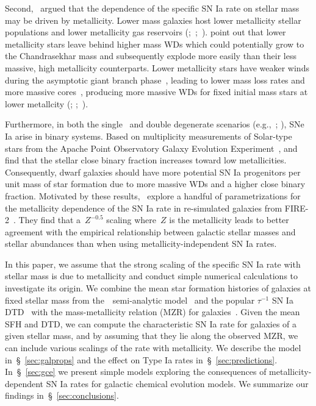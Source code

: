\documentclass[foo.tex]{subfiles}
\begin{document}
Second,~\citet{Kistler2013} argued that the dependence of the specific SN Ia
rate on stellar mass may be driven by metallicity.
Lower mass galaxies host lower metallicity stellar populations
\citep{Gallazzi2005, Kirby2013, Simon2019} and lower metallicity gas reservoirs
(\citealp{Tremonti2004};~\citealp*{Zahid2011};~\citealp{Andrews2013,
Zahid2014}).
\citet{Kistler2013} point out that lower metallicity stars leave behind higher
mass WDs which could potentially grow to the Chandrasekhar mass and
subsequently explode more easily than their less massive, high metallicity
counterparts.
Lower metallicity stars have weaker winds during the asymptotic giant branch
phase~\citep{Willson2000, Marigo2007}, leading to lower mass loss rates and
more massive cores~\citep{Kalirai2014}, producing more massive WDs for fixed
initial mass stars at lower metallcity (\citealp{Umeda1999};
\citealp*{Meng2008};~\citealp{Zhao2012}).
\par
Furthermore, in both the single~\citep[e.g.,][]{Whelan1973} and double
degenerate scenarios (e.g.,~\mbox{\citealp{Iben1984}};
\mbox{\citealp{Webbink1984}}), SNe Ia arise in binary systems.
Based on multiplicity measurements of Solar-type stars from the Apache Point
Observatory Galaxy Evolution Experiment~\citep[APOGEE;][]{Majewski2017},
\citet{Badenes2018} and~\citet*{Moe2019} find that the stellar close binary
fraction increases toward low metallicities.
Consequently, dwarf galaxies should have more potential SN Ia progenitors per
unit mass of star formation due to more massive WDs and a higher close binary
fraction.
Motivated by these results,~\citet{Gandhi2022} explore a handful of
parametrizations for the metallicity dependence of the SN Ia rate in
re-simulated galaxies from FIRE-2~\citep{Hopkins2018}.
They find that a~$Z^{-0.5}$ scaling where~$Z$ is the metallicity leads
to better agreement with the empirical relationship between galactic stellar
masses and stellar abundances than when using metallicity-independent SN Ia
rates.
\par
In this paper, we assume that the strong scaling of the specific SN Ia rate
with stellar mass is due to metallicity and conduct simple numerical
calculations to investigate its origin.
We combine the mean star formation histories of galaxies at fixed stellar
mass from the~\um~semi-analytic model~\citep{Behroozi2019} and the popular
$\tau^{-1}$ SN Ia DTD~\citep[e.g.,][]{Maoz2012a} with the mass-metallicity
relation (MZR) for galaxies~\citep{Tremonti2004, Andrews2013, Zahid2011,
Zahid2014}.
Given the mean SFH and DTD, we can compute the characteristic SN Ia rate for
galaxies of a given stellar mass, and by assuming that they lie along the
observed MZR, we can include various scalings of the rate with metallicity.
We describe the model in~\S~\ref{sec:galprops} and the effect on Type Ia rates
in~\S~\ref{sec:predictions}.
In~\S~\ref{sec:gce} we present simple models exploring the consequences of
metallicity-dependent SN Ia rates for galactic chemical evolution models.
We summarize our findings in~\S~\ref{sec:conclusions}.
\end{document}
